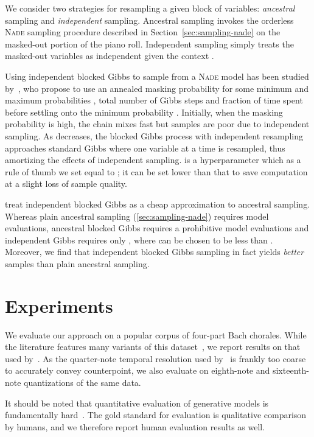 \documentclass{article}
\newcommand{\nade}{\textsc{Nade}\xspace}
\begin{document}
We consider two strategies for resampling a given block of variables:
\emph{ancestral} sampling and \emph{independent} sampling.
Ancestral sampling invokes the orderless \nade sampling procedure described in Section~\ref{sec:sampling-nade} on the masked-out portion of the piano roll.
Independent sampling simply treats the masked-out variables  as independent given the context .

Using independent blocked Gibbs to sample from a \nade model has been studied by~\cite{yao2014equivalence}, who propose to use an annealed masking probability  for some minimum and maximum probabilities , total number of Gibbs steps  and fraction  of time spent before settling onto the minimum probability .
Initially, when the masking probability is high, the chain mixes fast but samples are poor due to independent sampling.
As  decreases, the blocked Gibbs process with independent resampling approaches standard Gibbs where one variable at a time is resampled, thus amortizing the effects of independent sampling.
 is a hyperparameter which as a rule of thumb we set equal to ; it can be set lower than that to save computation at a slight loss of sample quality.


\cite{yao2014equivalence} treat independent blocked Gibbs as a cheap approximation to ancestral sampling.
Whereas plain ancestral sampling (\ref{sec:sampling-nade}) requires  model evaluations, ancestral blocked Gibbs requires a prohibitive  model evaluations and independent Gibbs requires only , where  can be chosen to be less than .
Moreover, we find that independent blocked Gibbs sampling
in fact yields \emph{better} samples than plain ancestral sampling.



\section{Experiments}
\label{sec:experiments}

We evaluate our approach on a popular corpus of four-part Bach chorales.
While the literature features many variants of this dataset~\cite{allan2005harmonising,boulanger2012modeling,liang2016bachbot,hadjeres2016style}, we report results on that used by~\cite{boulanger2012modeling}.
As the quarter-note temporal resolution used by~\cite{boulanger2012modeling} is frankly too coarse to accurately convey counterpoint,
we also evaluate on eighth-note and sixteenth-note quantizations of the same data.

It should be noted that quantitative evaluation of generative models is fundamentally hard~\cite{theis2015note}.
The gold standard for evaluation is qualitative comparison by humans, and we therefore report human evaluation results as well.
\end{document}
